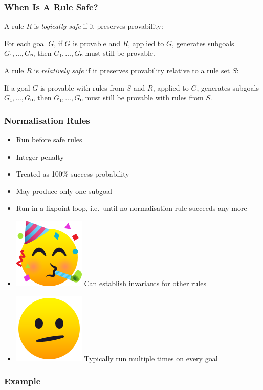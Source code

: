 \documentclass[xetex]{beamer}
\newlength{\emojiheight}
\newcommand{\good}{\includegraphics[height=\emojiheight]{images/1f973}}
\newcommand{\bad}{\includegraphics[height=\emojiheight]{images/1fae4}}
\newcommand{\orange}[1]{\textcolor{orange}{#1}}
\newenvironment{rapppic}{\begin{tikzpicture}[outer sep=auto, level distance=2em]}{\end{tikzpicture}}
\newenvironment{rapp}{%
  \begin{tcolorbox}
  \begin{center}
  \begin{rapppic}
}{
  \end{rapppic}
  \end{center}
  \end{tcolorbox}%
}
\begin{document}
\begin{frame}
  \frametitle{When Is A Rule Safe?}

  A rule $R$ is \emph{logically safe} if it preserves provability:

  For each goal $G$, if $G$ is provable and $R$, applied to $G$, generates subgoals $G₁, \dots, Gₙ$, then $G₁, \dots, Gₙ$ must still be provable.

  \pause

  A rule $R$ is \emph{relatively safe} if it preserves provability relative to a rule set $S$:

  If a goal $G$ is provable with rules from $S$ and $R$, applied to $G$, generates subgoals $G₁, \dots, Gₙ$, then $G₁, \dots, Gₙ$ must still be provable with rules from $S$.
\end{frame}

\begin{frame}
  \frametitle{Normalisation Rules}

  \begin{itemize}[<+->]
    \item Run before safe rules
    \item Integer penalty
    \item Treated as 100\% success probability
    \item May produce only one subgoal
    \item Run in a fixpoint loop, i.e.\ until no normalisation rule succeeds any more
    \item \good{} Can establish invariants for other rules
    \item \bad{} Typically run multiple times on every goal
  \end{itemize}
\end{frame}

\begin{frame}
  \frametitle{Example}

\end{frame}

\end{document}
